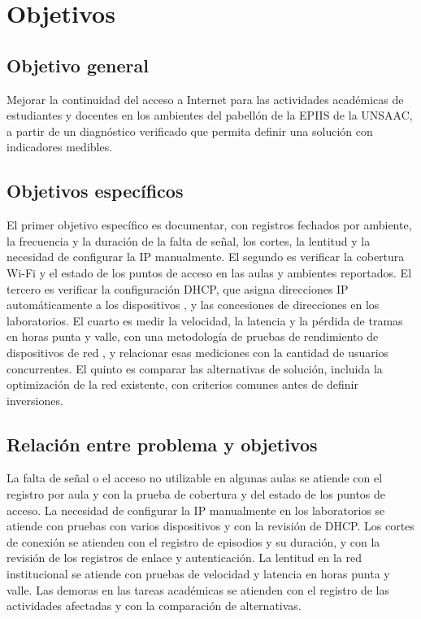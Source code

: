 \section{Objetivos}

\subsection{Objetivo general}

	Mejorar la continuidad del acceso a Internet para las actividades académicas de estudiantes y docentes en los ambientes del pabellón de la EPIIS de la UNSAAC, a partir de un diagnóstico verificado que permita definir una solución con indicadores medibles.

\subsection{Objetivos específicos}

	El primer objetivo específico es documentar, con registros fechados por ambiente, la frecuencia y la duración de la falta de señal, los cortes, la lentitud y la necesidad de configurar la IP manualmente. El segundo es verificar la cobertura Wi-Fi y el estado de los puntos de acceso en las aulas y ambientes reportados. El tercero es verificar la configuración DHCP, que asigna direcciones IP automáticamente a los dispositivos \cite{rfc2131}, y las concesiones de direcciones en los laboratorios. El cuarto es medir la velocidad, la latencia y la pérdida de tramas en horas punta y valle, con una metodología de pruebas de rendimiento de dispositivos de red \cite{rfc2544}, y relacionar esas mediciones con la cantidad de usuarios concurrentes. El quinto es comparar las alternativas de solución, incluida la optimización de la red existente, con criterios comunes antes de definir inversiones.

\subsection{Relación entre problema y objetivos}

	La falta de señal o el acceso no utilizable en algunas aulas se atiende con el registro por aula y con la prueba de cobertura y del estado de los puntos de acceso. La necesidad de configurar la IP manualmente en los laboratorios se atiende con pruebas con varios dispositivos y con la revisión de DHCP. Los cortes de conexión se atienden con el registro de episodios y su duración, y con la revisión de los registros de enlace y autenticación. La lentitud en la red institucional se atiende con pruebas de velocidad y latencia en horas punta y valle. Las demoras en las tareas académicas se atienden con el registro de las actividades afectadas y con la comparación de alternativas.

